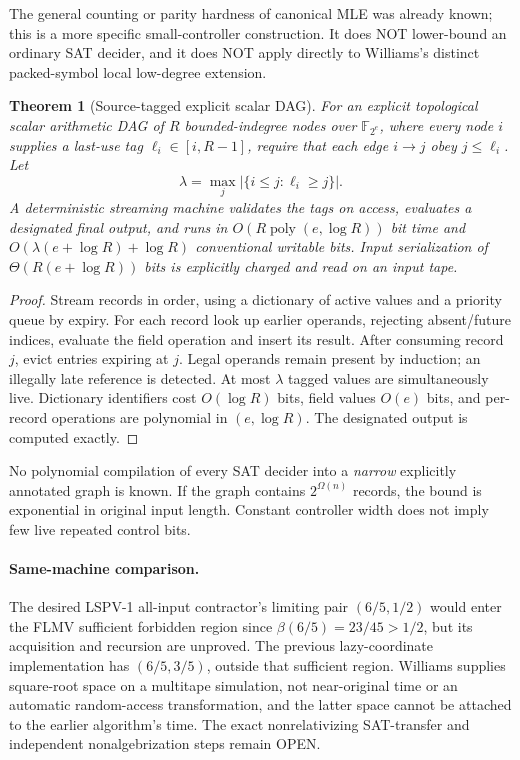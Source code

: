\documentclass[11pt]{article}
\newtheorem{theorem}{Theorem}
\begin{document}
The general counting or parity hardness of canonical MLE was already known; this is a more specific small-controller construction. It does NOT lower-bound an ordinary SAT decider, and it does NOT apply directly to Williams's distinct packed-symbol local low-degree extension.
\begin{theorem}[Source-tagged explicit scalar DAG]
For an explicit topological scalar arithmetic DAG of $R$ bounded-indegree nodes over $\mathbb F_{2^e}$, where every node $i$ supplies a last-use tag $\ell_i\in[i,R-1]$, require that each edge $i\to j$ obey $j\le\ell_i$. Let
\[
\lambda=\max_j|\{i\le j:\ell_i\ge j\}|.
\]
A deterministic streaming machine validates the tags on access, evaluates a designated final output, and runs in $O(R\operatorname{poly}(e,\log R))$ bit time and $O(\lambda(e+\log R)+\log R)$ conventional writable bits. Input serialization of $\Theta(R(e+\log R))$ bits is explicitly charged and read on an input tape.
\end{theorem}
\begin{proof}
Stream records in order, using a dictionary of active values and a priority queue by expiry. For each record look up earlier operands, rejecting absent/future indices, evaluate the field operation and insert its result. After consuming record $j$, evict entries expiring at $j$. Legal operands remain present by induction; an illegally late reference is detected. At most $\lambda$ tagged values are simultaneously live. Dictionary identifiers cost $O(\log R)$ bits, field values $O(e)$ bits, and per-record operations are polynomial in $(e,\log R)$. The designated output is computed exactly.
\end{proof}
No polynomial compilation of every SAT decider into a \emph{narrow} explicitly annotated graph is known. If the graph contains $2^{\Omega(n)}$ records, the bound is exponential in original input length. Constant controller width does not imply few live repeated control bits.
\paragraph{Same-machine comparison.}
The desired LSPV-1 all-input contractor's limiting pair $(6/5,1/2)$ would enter the FLMV sufficient forbidden region since $\beta(6/5)=23/45>1/2$, but its acquisition and recursion are unproved. The previous lazy-coordinate implementation has $(6/5,3/5)$, outside that sufficient region. Williams supplies square-root space on a multitape simulation, not near-original time or an automatic random-access transformation, and the latter space cannot be attached to the earlier algorithm's time. The exact nonrelativizing SAT-transfer and independent nonalgebrization steps remain OPEN.
\end{document}
